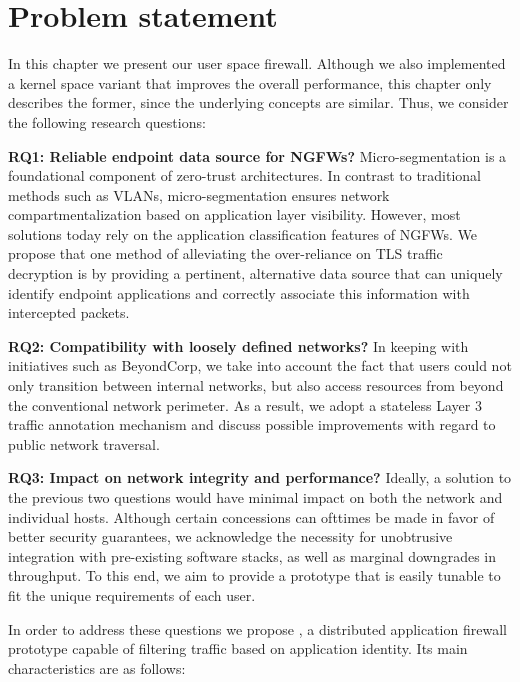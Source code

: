 \section{Problem statement}

In this chapter we present \daf{} our user space firewall. Although we also
implemented a kernel space variant that improves the overall performance, this
chapter only describes the former, since the underlying concepts are similar.
Thus, we consider the following research questions:

\textbf{RQ1: Reliable endpoint data source for NGFWs?} Micro-segmentation is a foundational component of zero-trust architectures. In contrast to traditional methods such as VLANs, micro-segmentation ensures network compartmentalization based on application layer visibility. However, most solutions today rely on the application classification features of NGFWs. We propose that one method of alleviating the over-reliance on TLS traffic decryption is by providing a pertinent, alternative data source that can uniquely identify endpoint applications and correctly associate this information with intercepted packets.

\textbf{RQ2: Compatibility with loosely defined networks?} In keeping with initiatives such as BeyondCorp, we take into account the fact that users could not only transition between internal networks, but also access resources from beyond the conventional network perimeter. As a result, we adopt a stateless Layer 3 traffic annotation mechanism and discuss possible improvements with regard to public network traversal.

\textbf{RQ3: Impact on network integrity and performance?} Ideally, a solution to the previous two questions would have minimal impact on both the network and individual hosts. Although certain concessions can ofttimes be made in favor of better security guarantees, we acknowledge the necessity for unobtrusive integration with pre-existing software stacks, as well as marginal downgrades in throughput. To this end, we aim to provide a prototype that is easily tunable to fit the unique requirements of each user.

In order to address these questions we propose \daf{}, a distributed application firewall prototype capable of filtering traffic based on application identity. Its main characteristics are as follows:

